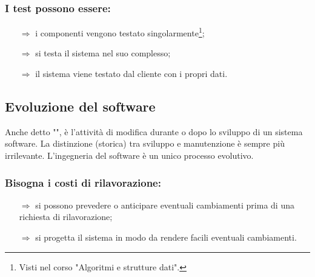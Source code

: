 
\subsubsection{I test possono essere:}

\begin{itemize}
    \item [$\Rightarrow$]  i componenti vengono
    testato singolarmente\footnote{Visti nel corso "Algoritmi e strutture dati".};
    \item [$\Rightarrow$]  si testa il sistema nel suo complesso;
    \item  [$\Rightarrow$]  il sistema viene testato dal cliente con i propri dati. 
\end{itemize}

\subsection{Evoluzione del software}

Anche detto "", è l'attività di
modifica durante o dopo lo sviluppo di un sistema software. La distinzione
(storica) tra sviluppo e manutenzione è sempre più irrilevante. L'ingegneria
del software è un unico processo evolutivo.


\subsubsection{Bisogna  i costi di rilavorazione:}

\begin{itemize}
    \item [$\Rightarrow$]  si possono prevedere
    o anticipare eventuali cambiamenti prima di una richiesta di rilavorazione;
    \item [$\Rightarrow$]  si progetta il sistema in modo
    da rendere facili eventuali cambiamenti.
\end{itemize}

